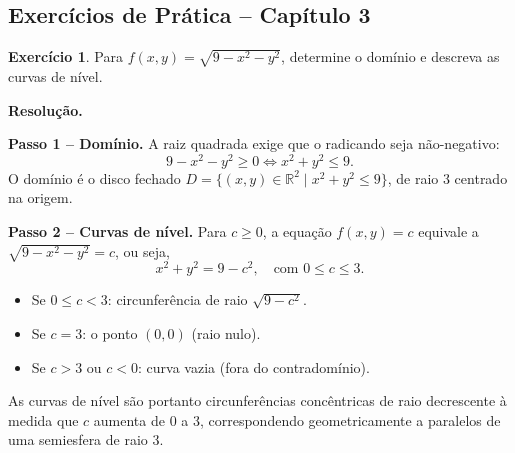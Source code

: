 \documentclass[12pt,a4paper]{article}
\theoremstyle{definition}
\newtheorem{exercise}{Exercício}[section]
\theoremstyle{remark}
\begin{document}
\subsection{Exercícios de Prática -- Capítulo 3}

\begin{exercise}
  Para $f(x,y)=\sqrt{9-x^2-y^2}$, determine o domínio e descreva as
  curvas de nível.

  \medskip\textbf{Resolução.}

  \textbf{Passo 1 -- Domínio.} A raiz quadrada exige que o radicando seja
  não-negativo:
  \[
    9-x^2-y^2 \geq 0 \iff x^2+y^2 \leq 9.
  \]
  O domínio é o disco fechado $D = \{(x,y)\in\mathbb{R}^2 \mid x^2+y^2\leq 9\}$,
  de raio $3$ centrado na origem.

  \textbf{Passo 2 -- Curvas de nível.} Para $c\geq 0$, a equação $f(x,y)=c$
  equivale a $\sqrt{9-x^2-y^2}=c$, ou seja,
  \[
    x^2+y^2 = 9-c^2, \quad \text{com } 0\leq c\leq 3.
  \]
  \begin{itemize}[nosep]
    \item Se $0\leq c < 3$: circunferência de raio $\sqrt{9-c^2}$.
    \item Se $c=3$: o ponto $(0,0)$ (raio nulo).
    \item Se $c>3$ ou $c<0$: curva vazia (fora do contradomínio).
  \end{itemize}
  As curvas de nível são portanto circunferências concêntricas de raio
  decrescente à medida que $c$ aumenta de $0$ a $3$, correspondendo
  geometricamente a paralelos de uma semiesfera de raio $3$.
\end{exercise}
\end{document}
